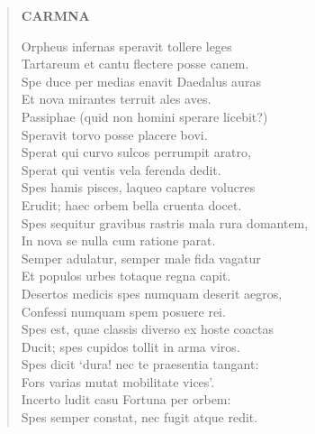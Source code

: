\documentclass[11pt, a4paper]{report}
\begin{document}
\begin{verse}
    \begin{center} \textbf{CARMNA} \end{center} \marginpar{[322]} Orpheus infernas speravit tollere leges \\ Tartareum et cantu flectere posse canem. \\ Spe duce per medias enavit Daedalus auras \\ Et nova mirantes terruit ales aves. \\ Passiphae (quid non homini sperare licebit?) \\ Speravit torvo posse placere bovi. \\ Sperat qui curvo sulcos perrumpit aratro, \\ Sperat qui ventis vela ferenda dedit. \\ Spes hamis pisces, laqueo captare volucres \\ Erudit; haec orbem bella cruenta docet. \\ Spes sequitur gravibus rastris mala rura domantem, \\ In nova se nulla cum ratione parat. \\ Semper adulatur, semper male fida vagatur \\ Et populos urbes totaque regna capit. \\ Desertos medicis spes numquam deserit aegros, \\ Confessi numquam spem posuere rei. \\ Spes est, quae classis diverso ex hoste coactas \\ Ducit; spes cupidos tollit in arma viros. \\ Spes dicit ‘dura! nec te praesentia tangant: \\ Fors varias mutat mobilitate vices’. \\ Incerto ludit casu Fortuna per orbem: \\ Spes semper constat, nec fugit atque redit. \\ 
      \end{verse}
  
\end{document}
